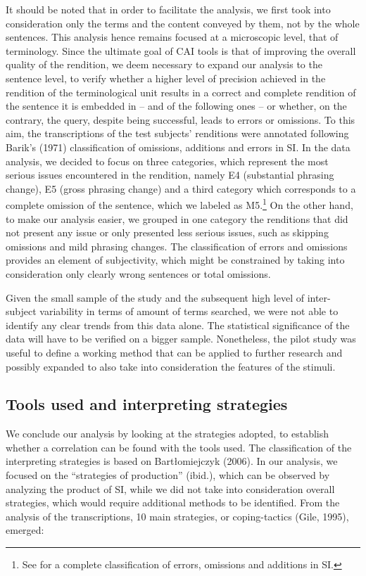 \documentclass[output=paper]{langsci/langscibook}
\begin{document}
It should be noted that in order to facilitate the analysis, we first took into consideration only the terms and the content conveyed by them, not by the whole sentences. This analysis hence remains focused at a microscopic level, that of terminology. Since the ultimate goal of CAI tools is that of improving the overall quality of the rendition, we deem necessary to expand our analysis to the sentence level, to verify whether a higher level of precision achieved in the rendition of the terminological unit results in a correct and complete rendition of the sentence it is embedded in – and of the following ones – or whether, on the contrary, the query, despite being successful, leads to errors or omissions. To this aim, the transcriptions of the test subjects’ renditions were annotated following Barik’s (1971) classification of omissions, additions and errors in SI. In the data analysis, we decided to focus on three categories, which represent the most serious issues encountered in the rendition, namely E4 (substantial phrasing change), E5 (gross phrasing change) and a third category which corresponds to a complete omission of the sentence, which we labeled as M5.\footnote{See \citet{Barik1971} for a complete classification of errors, omissions and additions in SI.}  On the other hand, to make our analysis easier, we grouped in one category the renditions that did not present any issue or only presented less serious issues, such as skipping omissions and mild phrasing changes. The classification of errors and omissions provides an element of subjectivity, which might be constrained by taking into consideration only clearly wrong sentences or total omissions.

Given the small sample of the study and the subsequent high level of inter-subject variability in terms of amount of terms searched, we were not able to identify any clear trends from this data alone. The statistical significance of the data will have to be verified on a bigger sample. Nonetheless, the pilot study was useful to define a working method that can be applied to further research and possibly expanded to also take into consideration the features of the stimuli. 

\subsection{Tools used and interpreting strategies}

We conclude our analysis by looking at the strategies adopted, to establish whether a correlation can be found with the tools used. The classification of the interpreting strategies is based on Bartłomiejczyk (2006). In our analysis, we focused on the “strategies of production” (ibid.), which can be observed by analyzing the product of SI, while we did not take into consideration overall strategies, which would require additional methods to be identified. From the analysis of the transcriptions, 10 main strategies, or coping-tactics (Gile, 1995), emerged:
\end{document}
